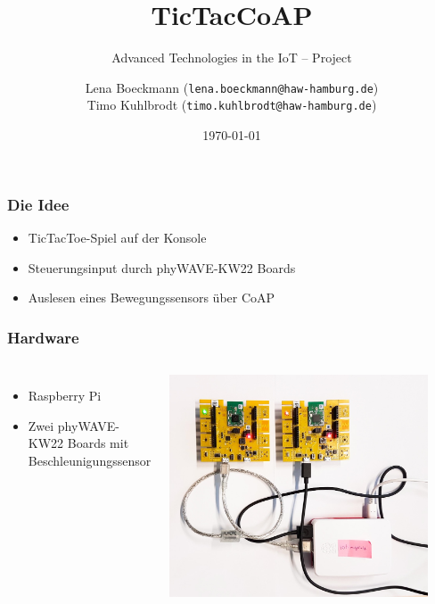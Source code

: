 \documentclass[aspectratio=169, 10pt]{beamer}
\title{TicTacCoAP}
\subtitle{Advanced Technologies in the IoT – Project}
\author{Lena Boeckmann (\texttt{lena.boeckmann@haw-hamburg.de})\\Timo Kuhlbrodt (\texttt{timo.kuhlbrodt@haw-hamburg.de})}
\date{\today}
\begin{document}
    \frame{\titlepage}
    \begin{frame}
        \frametitle{Die Idee}
        \begin{itemize}
            \item TicTacToe-Spiel auf der Konsole
            \item Steuerungsinput durch phyWAVE-KW22 Boards
            \item Auslesen eines Bewegungssensors über CoAP
        \end{itemize}
    \end{frame}

    \begin{frame}
        \frametitle{Hardware}
        \begin{columns}{}
            \begin{itemize}
                \item Raspberry Pi
                \item Zwei phyWAVE-KW22 Boards mit Beschleunigungssensor
            \end{itemize}
            \includegraphics[width=0.9\textwidth]{figs/setup.jpg}
        \end{columns}

    \end{frame}
\end{document}
